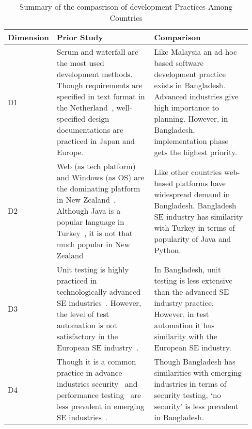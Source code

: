 
\begin{table}
    \centering
    \caption{Summary of the compasrison of development Practices Among Countries}
    \label{table:comparison_summary}
    \begin{tabularx}{\textwidth}{v|m|m}
    \hline
    \textbf{Dimension}& \textbf{Prior Study}& \textbf{Comparison}\\ \hline
    D1 & Scrum and waterfall \citep{Wang2018,Garousi2015} are the most used development methods. Though requirements are specified in text format in the Netherland~\citep{Vonken2012}, well-specified design documentations are practiced in Japan and Europe\citep{Cusumano2003}. & Like Malaysia an ad-hoc based software development practice exists in Bangladesh. Advanced industries give high importance to planning. However, in Bangladesh, implementation phase gets the highest priority. \\ \hline
    
    
    D2 & Web (as tech platform) and Windows (as OS) are the dominating platform in New Zealand~\citep{Wang2018}. Although Java is a popular language in Turkey~\citep{Garousi2015}, it is not that much popular in New Zealand~\citep{Wang2018} &  Like other countries web-based platforms have widespread demand in Bangladesh. Bangladesh SE industry has similarity with Turkey in terms of popularity of Java and Python. \\ \hline
    
    
    D3 & Unit testing is highly practiced in technologically advanced SE industries~\citep{Garousi2013, Wang2018}. However, the level of test automation is not satisfactory in the European SE industry~\citep{dutta1999}. & In Bangladesh, unit testing is less extensive than the advanced SE industry practice. However, in test automation it has similarity with the European SE industry.\\ \hline
    
    D4 & Though it is a common practice in advance industries security~\citep{Garousi2015, Farvin2016, Bahl2011, Sung2006} and performance testing~\citep{Garousi2013,Garousi2015,Phillips2003} are less prevalent in emerging SE industries~\citep{Jahan2019}. &  Though Bangladesh has similarities with emerging industries in terms of security testing, `no security' is less prevalent in Bangladesh.\\ \hline


    \end{tabularx}
\end{table}

